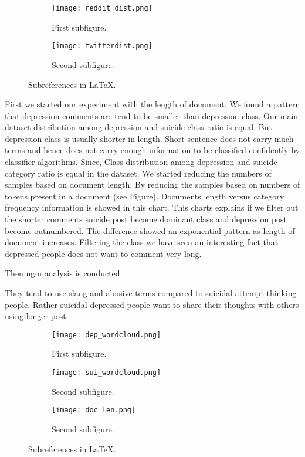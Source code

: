 \documentclass[12pt, letterpaper]{article}
\begin{document}
\begin{figure}[h!]
\centering
\begin{subfigure}{0.45\textwidth}
    \texttt{[image: reddit\_dist.png]}
    \caption{First subfigure.}
    \label{fig:first}
\end{subfigure}
\hfill
\begin{subfigure}{0.45\textwidth}
    \texttt{[image: twitterdist.png]}
    \caption{Second subfigure.}
    \label{fig:second}
\end{subfigure}
        
\caption{Subreferences in \LaTeX.}
\label{fig:figures}
\end{figure}


First we started our experiment with the length of document. We found a pattern that depression comments are tend to be smaller than depression class. Our main dataset distribution among depression and suicide class ratio is equal. But  depression class is usually shorter in length. Short sentence does not carry much terms and hence does not carry enough information to be classified confidently by classifier algorithms. Since, Class distribution among depression and suicide category ratio is equal in the dataset. We started reducing the numbers of samples based on document length. By reducing the samples based on numbers of tokens present in a document (see Figure). Documents length versus category frequency information is showed in this chart. This charts explains if we filter out the shorter comments suicide post become dominant class and depression post become outnumbered. The difference showed an exponential pattern as length of document increases. Filtering the class we have seen an interesting fact that depressed people does not want to comment very long. 

Then ngm analysis is conducted. 


They tend to use slang and abusive terms compared to suicidal attempt thinking people. Rather suicidal depressed people want to share their thoughts with others using longer post. 

\begin{figure}[H]
\centering
\begin{subfigure}{0.45\textwidth}
    \texttt{[image: dep\_wordcloud.png]}
    \caption{First subfigure.}
    \label{fig:first}
\end{subfigure}
\hfill
\begin{subfigure}{0.45\textwidth}
    \texttt{[image: sui\_wordcloud.png]}
    \caption{Second subfigure.}
    \label{fig:second}
\end{subfigure}
\hfill
\begin{subfigure}{0.8\textwidth}
    \texttt{[image: doc\_len.png]}
    \caption{Second subfigure.}
    \label{fig:second}
\end{subfigure}
        
\caption{Subreferences in \LaTeX.}
\label{fig:figures}
\end{figure}
\end{document}
